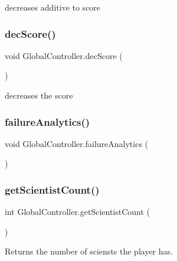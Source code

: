decreases additive to score 

\mbox{\label{class_global_controller_a3c6c2fe54c92b170a0f0cc41c7230a09}} 
\subsubsection{\texorpdfstring{dec\+Score()}{decScore()}}
{\footnotesize\ttfamily void Global\+Controller.\+dec\+Score (\begin{DoxyParamCaption}{ }\end{DoxyParamCaption})}



decreases the score 

\mbox{\label{class_global_controller_a6a9521c88ce33872ebc420e4d8bd5e48}} 
\subsubsection{\texorpdfstring{failure\+Analytics()}{failureAnalytics()}}
{\footnotesize\ttfamily void Global\+Controller.\+failure\+Analytics (\begin{DoxyParamCaption}{ }\end{DoxyParamCaption})}

\mbox{\label{class_global_controller_aa5e702709ea41c25a8a537556671ff47}} 
\subsubsection{\texorpdfstring{get\+Scientist\+Count()}{getScientistCount()}}
{\footnotesize\ttfamily int Global\+Controller.\+get\+Scientist\+Count (\begin{DoxyParamCaption}{ }\end{DoxyParamCaption})}



Returns the number of sciensts the player has. 


